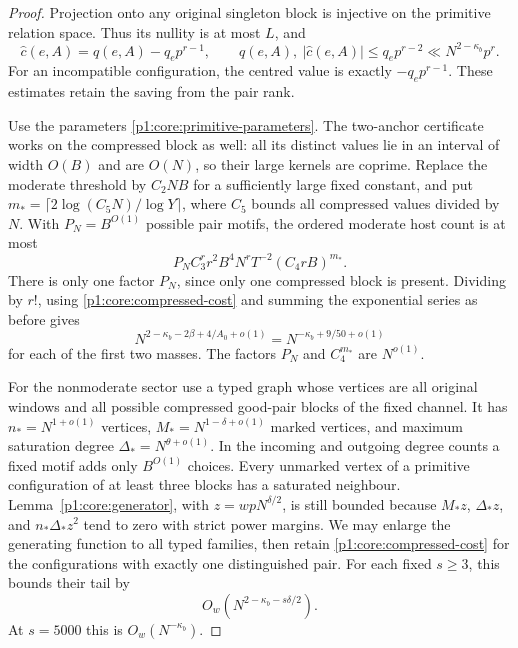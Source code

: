 \begin{proof}
Projection onto any original singleton block is injective on the
primitive relation space. Thus its nullity is at most $L$, and
\begin{equation}
 \widehat c(e,A)=q(e,A)-q_ep^{r-1},\qquad
 q(e,A),\ |\widehat c(e,A)|\le q_ep^{r-2}
       \ll N^{2-\kappa_b}p^r.
 \label{p1:core:compressed-cost}
\end{equation}
For an incompatible configuration, the centred value is exactly
$-q_ep^{r-1}$. These estimates retain the saving from the pair rank.

Use the parameters \eqref{p1:core:primitive-parameters}. The two-anchor
certificate works on the compressed block as well: all its distinct
values lie in an interval of width $O(B)$ and are $O(N)$, so their
large kernels are coprime. Replace the moderate threshold by $C_2NB$
for a sufficiently large fixed constant, and put
$m_*=\lceil2\log(C_5N)/\log Y\rceil$, where $C_5$ bounds all
compressed values divided by $N$. With $P_N=B^{O(1)}$ possible
pair motifs, the ordered moderate host count is at most
\[
 P_N C_3^r r^2B^4N^rT^{-2}(C_4rB)^{m_*}.
\]
There is only one factor $P_N$, since only one compressed block is
present. Dividing by $r!$, using \eqref{p1:core:compressed-cost} and
summing the exponential series as before gives
\begin{equation}
 N^{2-\kappa_b-2\beta+4/A_0+o(1)}
       =N^{-\kappa_b+9/50+o(1)}
 \label{p1:core:compressed-moderate}
\end{equation}
for each of the first two masses. The factors $P_N$ and $C_4^{m_*}$
are $N^{o(1)}$.

For the nonmoderate sector use a typed graph whose vertices are all
original windows and all possible compressed good-pair blocks of the
fixed channel. It has $n_*=N^{1+o(1)}$ vertices,
$M_*=N^{1-\delta+o(1)}$ marked vertices, and maximum saturation degree
$\Delta_*=N^{\theta+o(1)}$. In the incoming and outgoing degree
counts a fixed motif adds only $B^{O(1)}$ choices. Every unmarked
vertex of a primitive configuration of at least three blocks has a
saturated neighbour. Lemma~\ref{p1:core:generator}, with
$z=wpN^{\delta/2}$, is still bounded because
$M_*z$, $\Delta_*z$, and $n_*\Delta_*z^2$ tend to zero with strict
power margins. We may enlarge the generating function to all typed
families, then retain \eqref{p1:core:compressed-cost} for the
configurations with exactly one distinguished pair. For each fixed
$s\ge3$, this bounds their tail by
\[
 O_w(N^{2-\kappa_b-s\delta/2}).
\]
At $s=5000$ this is $O_w(N^{-\kappa_b})$.


\end{proof}
